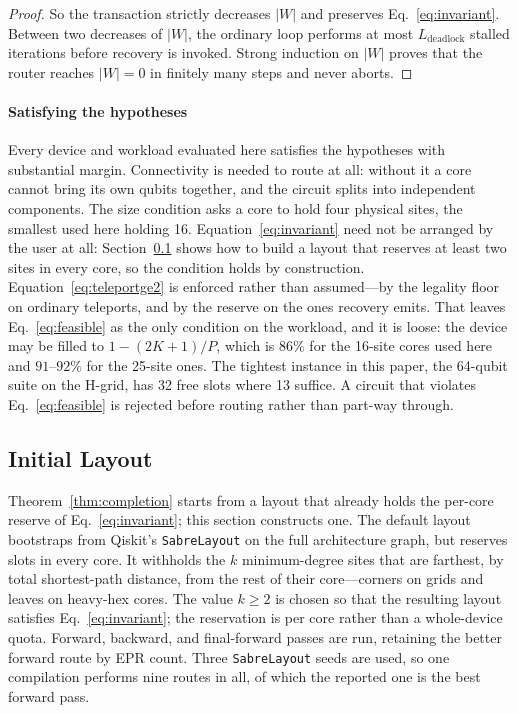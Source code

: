 \documentclass[journal]{IEEEtran}
\begin{document}
\begin{proof}
So the transaction strictly decreases $|W|$ and preserves Eq.~\eqref{eq:invariant}. Between two decreases of $|W|$, the ordinary loop performs at most $L_{\mathrm{deadlock}}$ stalled iterations before recovery is invoked. Strong induction on $|W|$ proves that the router reaches $|W|=0$ in finitely many steps and never aborts.
\end{proof}

\paragraph*{Satisfying the hypotheses}
Every device and workload evaluated here satisfies the hypotheses with substantial margin. Connectivity is needed to route at all: without it a core cannot bring its own qubits together, and the circuit splits into independent components. The size condition asks a core to hold four physical sites, the smallest used here holding 16. Equation~\eqref{eq:invariant} need not be arranged by the user at all: Section~\ref{sec:initial_mapping} shows how to build a layout that reserves at least two sites in every core, so the condition holds by construction. Equation~\eqref{eq:teleportge2} is enforced rather than assumed---by the legality floor on ordinary teleports, and by the reserve on the ones recovery emits. That leaves Eq.~\eqref{eq:feasible} as the only condition on the workload, and it is loose: the device may be filled to $1-(2K+1)/P$, which is $86\%$ for the 16-site cores used here and $91$--$92\%$ for the 25-site ones. The tightest instance in this paper, the 64-qubit suite on the H-grid, has 32 free slots where 13 suffice. A circuit that violates Eq.~\eqref{eq:feasible} is rejected before routing rather than part-way through.

\subsection{Initial Layout}
\label{sec:initial_mapping}

Theorem~\ref{thm:completion} starts from a layout that already holds the per-core reserve of Eq.~\eqref{eq:invariant}; this section constructs one. The default layout bootstraps from Qiskit's \texttt{SabreLayout} on the full architecture graph, but reserves slots in every core. It withholds the $k$ minimum-degree sites that are farthest, by total shortest-path distance, from the rest of their core---corners on grids and leaves on heavy-hex cores. The value $k\ge2$ is chosen so that the resulting layout satisfies Eq.~\eqref{eq:invariant}; the reservation is per core rather than a whole-device quota. Forward, backward, and final-forward passes are run, retaining the better forward route by EPR count. Three \texttt{SabreLayout} seeds are used, so one compilation performs nine routes in all, of which the reported one is the best forward pass.
\end{document}
